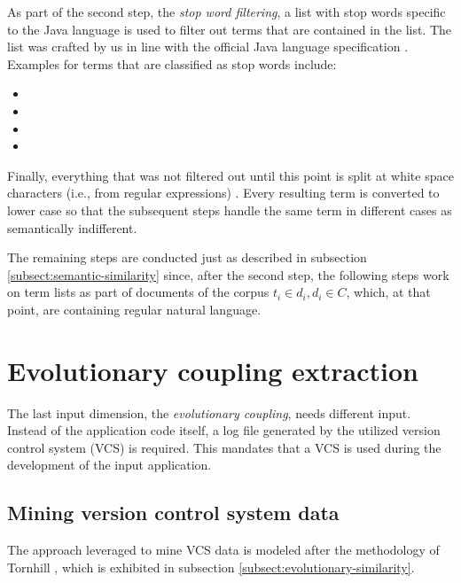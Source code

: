 \documentclass[12pt,a4paper]{report}
\begin{document}
As part of the second step, the \textit{stop word filtering},
a list with stop words specific to the Java language is used to filter out terms
that are contained in the list. The list was crafted by us in line with the
official Java language specification \cite{oracle-java11}. Examples for terms
that are classified as stop words include:
\begin{itemize}[noitemsep]
  \item {}
  \item {}
  \item {}
  \item {}
\end{itemize}

Finally, everything that was not filtered out until this point is split at
white space characters (i.e.,  from regular expressions)
\cite{ieee1992posix}. Every resulting term is converted to
lower case so that the subsequent steps handle the same term in different cases
as semantically indifferent.

The remaining steps are conducted just as described in subsection
\ref{subsect:semantic-similarity} since, after the second step, the following
steps work on term lists as part of documents of the corpus
\(t_i \in d_i, d_i \in C\), which, at that point, are containing regular natural language.



\section{Evolutionary coupling extraction} \label{sect:evolutionary-coupling-extraction}

The last input dimension, the \textit{evolutionary coupling}, needs different
input. Instead of the application code itself, a log file generated by the
utilized version control system (VCS) is required. This mandates that a VCS is
used during the development of the input application.


\subsection{Mining version control system data}

The approach leveraged to mine VCS data is modeled after the methodology of
Tornhill \cite{tornhill2015crimescene}, which is exhibited in subsection
\ref{subsect:evolutionary-similarity}.
\end{document}
